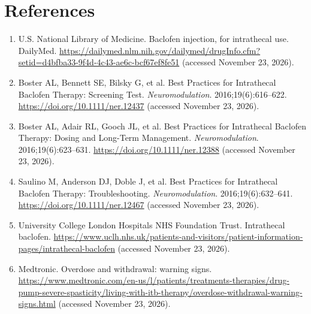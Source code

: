 \section*{References}
\begin{enumerate}
  \item U.S. National Library of Medicine. Baclofen injection, for intrathecal use. DailyMed. \url{https://dailymed.nlm.nih.gov/dailymed/drugInfo.cfm?setid=d4bfba33-9f4d-4c43-ae6c-bcf67ef8fe51} (accessed November 23, 2026).
  \item Boster AL, Bennett SE, Bilsky G, et al. Best Practices for Intrathecal Baclofen Therapy: Screening Test. \textit{Neuromodulation}. 2016;19(6):616--622. \url{https://doi.org/10.1111/ner.12437} (accessed November 23, 2026).
  \item Boster AL, Adair RL, Gooch JL, et al. Best Practices for Intrathecal Baclofen Therapy: Dosing and Long-Term Management. \textit{Neuromodulation}. 2016;19(6):623--631. \url{https://doi.org/10.1111/ner.12388} (accessed November 23, 2026).
  \item Saulino M, Anderson DJ, Doble J, et al. Best Practices for Intrathecal Baclofen Therapy: Troubleshooting. \textit{Neuromodulation}. 2016;19(6):632--641. \url{https://doi.org/10.1111/ner.12467} (accessed November 23, 2026).
  \item University College London Hospitals NHS Foundation Trust. Intrathecal baclofen. \url{https://www.uclh.nhs.uk/patients-and-visitors/patient-information-pages/intrathecal-baclofen} (accessed November 23, 2026).
  \item Medtronic. Overdose and withdrawal: warning signs. \url{https://www.medtronic.com/en-us/l/patients/treatments-therapies/drug-pump-severe-spasticity/living-with-itb-therapy/overdose-withdrawal-warning-signs.html} (accessed November 23, 2026).
\end{enumerate}

\clearpage
